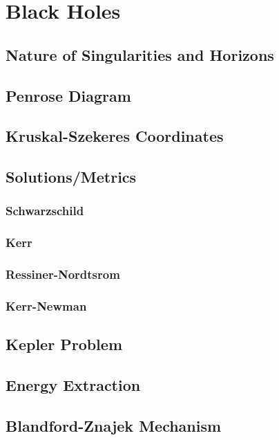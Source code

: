 \setchapterpreamble[u]{\margintoc}
\chapter{Black Holes}

\section{Nature of Singularities and Horizons}
\section{Penrose Diagram}
\section{Kruskal-Szekeres Coordinates}
\section{Solutions/Metrics}
\subsection{Schwarzschild}
\subsection{Kerr}
\subsection{Ressiner-Nordtsrom}
\subsection{Kerr-Newman}

\section{Kepler Problem}
\section{Energy Extraction}
\section{Blandford-Znajek Mechanism}
